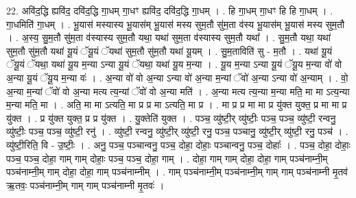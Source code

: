 \documentclass[17pt]{extarticle}
\begin{document}
22. अवि॑द॒द्धि ह्यवि॑द॒ दवि॑द॒द्धि गा॒धम् गा॒धꣳ ह्यवि॑द॒ दवि॑द॒द्धि गा॒धम् । . हि गा॒धम् गा॒धꣳ हि हि गा॒धम् । . गा॒धमिति॑ गा॒धम् । . भू॒यास॑ मस्यास्य भू॒यास॑म् भू॒यास॑ मस्य सुम॒तौ सु॑म॒ता व॑स्य भू॒यास॑म् भू॒यास॑ मस्य सुम॒तौ । . अ॒स्य॒ सु॒म॒तौ सु॑म॒ता व॑स्यास्य सुम॒तौ यथा॒ यथा॑ सुम॒ता व॑स्यास्य सुम॒तौ यथा᳚ । . सु॒म॒तौ यथा॒ यथा॑ सुम॒तौ सु॑म॒तौ यथा॑ यू॒यं ॅयू॒यं ॅयथा॑ सुम॒तौ सु॑म॒तौ यथा॑ यू॒यम् । . सु॒म॒ताविति॑ सु - म॒तौ । . यथा॑ यू॒यं ॅयू॒यं ॅयथा॒ यथा॑ यू॒य म॒न्या ऽन्या यू॒यं ॅयथा॒ यथा॑ यू॒य म॒न्या । . यू॒य म॒न्या ऽन्या यू॒यं ॅयू॒य म॒न्या वो॑ वो अ॒न्या यू॒यं ॅयू॒य म॒न्या वः॑ । . अ॒न्या वो॑ वो अ॒न्या ऽन्या वो॑ अ॒न्या म॒न्यां ॅवो॑ अ॒न्या ऽन्या वो॑ अ॒न्याम् । . वो॒ अ॒न्या म॒न्यां ॅवो॑ वो अ॒न्या मत्य त्य॒न्यां ॅवो॑ वो अ॒न्या मति॑ । . अ॒न्या मत्य त्य॒न्या म॒न्या मति॒ मा मा ऽत्य॒न्या म॒न्या मति॒ मा । . अति॒ मा मा ऽत्यति॒ मा प्र प्र मा ऽत्यति॒ मा प्र । . मा प्र प्र मा मा प्र यु॑क्त युक्त॒ प्र मा मा प्र यु॑क्त । . प्र यु॑क्त युक्त॒ प्र प्र यु॑क्त । . यु॒क्तेति॑ युक्त । . पञ्च॒ व्यु॑ष्टी॒र् व्यु॑ष्टीः॒ पञ्च॒ पञ्च॒ व्यु॑ष्टी॒ रन्वनु॒ व्यु॑ष्टीः॒ पञ्च॒ पञ्च॒ व्यु॑ष्टी॒ रनु॑ । . व्यु॑ष्टी॒ रन्वनु॒ व्यु॑ष्टी॒र् व्यु॑ष्टी॒ रनु॒ पञ्च॒ पञ्चानु॒ व्यु॑ष्टी॒र् व्यु॑ष्टी॒ रनु॒ पञ्च॑ । . व्यु॑ष्टी॒रिति॒ वि - उ॒ष्टीः॒ । . अनु॒ पञ्च॒ पञ्चान्वनु॒ पञ्च॒ दोहा॒ दोहाः॒ पञ्चान्वनु॒ पञ्च॒ दोहाः᳚ । . पञ्च॒ दोहा॒ दोहाः॒ पञ्च॒ पञ्च॒ दोहा॒ गाम् गाम् दोहाः॒ पञ्च॒ पञ्च॒ दोहा॒ गाम् । . दोहा॒ गाम् गाम् दोहा॒ दोहा॒ गाम् पञ्च॑नाम्नी॒म् पञ्च॑नाम्नी॒म् गाम् दोहा॒ दोहा॒ गाम् पञ्च॑नाम्नीम् । . गाम् पञ्च॑नाम्नी॒म् पञ्च॑नाम्नी॒म् गाम् गाम् पञ्च॑नाम्नी मृ॒तव॑ ऋ॒तवः॒ पञ्च॑नाम्नी॒म् गाम् गाम् पञ्च॑नाम्नी मृ॒तवः॑ । \newline
\end{document}
